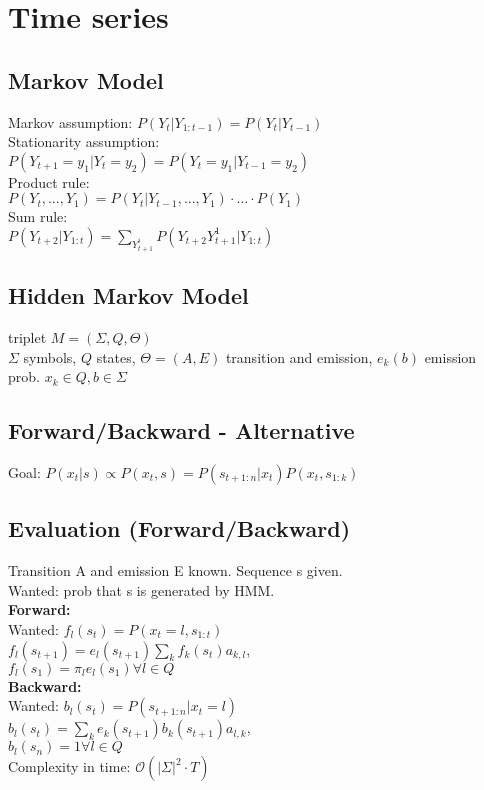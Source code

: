 \section{Time series}
\subsection*{Markov Model}
Markov assumption: $P(Y_t|Y_{1:t-1}) = P(Y_t|Y_{t-1})$\\
Stationarity assumption:\\
$P(Y_{t+1}=y_1|Y_t=y_2) = P(Y_t=y_1|Y_{t-1}=y_2)$\\
Product rule:\\
$P(Y_t,...,Y_1) = P(Y_t|Y_{t-1},...,Y_1)\cdot ... \cdot P(Y_1)$\\
Sum rule:\\
$P(Y_{t+2}|Y_{1:t}) = \sum_{Y_{t+1}^i} P(Y_{t+2}Y_{t+1}^1|Y_{1:t})$
\subsection*{Hidden Markov Model}
triplet $M = (\Sigma, Q, \Theta)$\\
$\Sigma$ symbols, $Q$ states, $\Theta=(A,E)$ transition and emission, $e_k(b)$ emission prob. $x_k \in Q, b \in \Sigma$
\subsection*{Forward/Backward - Alternative}
Goal: $P(x_t|s) \propto P(x_t,s) = P(s_{t+1:n}|x_t)P(x_t,s_{1:k})$
\subsection*{Evaluation (Forward/Backward)}
Transition A and emission E known. Sequence s given.\\
Wanted: prob that s is generated by HMM.\\
\textbf{Forward:}\\
Wanted: $f_l(s_t) = P(x_t = l, s_{1:t})$\\
$f_l(s_{t+1}) = e_l(s_{t+1})\sum_k f_k(s_t) a_{k,l}$,\\
$f_l(s_1) = \pi_l e_l(s_1) \forall l \in Q$\\
\textbf{Backward:}\\
Wanted: $b_l(s_t) = P(s_{t+1:n}|x_t = l)$\\
$b_l(s_t) = \sum_k e_k(s_{t+1}) b_k(s_{t+1}) a_{l,k}$,\\
$b_l(s_n) = 1 \forall l \in Q$\\
Complexity in time: $\mathcal{O}(|\Sigma|^2 \cdot T)$

